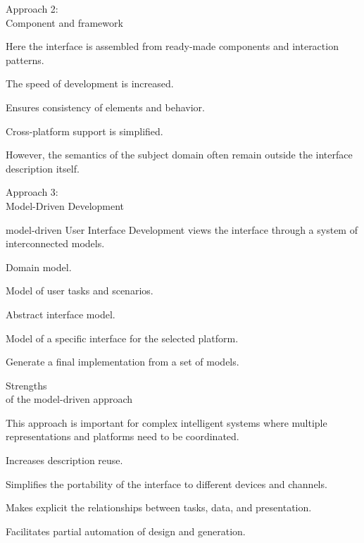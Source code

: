\begin{frame}{Approach 2:\\ Component and framework}
	\topline
	\justifying
	
	Here the interface is assembled from ready-made components and interaction patterns.
	
	\begin{textitemize}
		\item The speed of development is increased.
		\item Ensures consistency of elements and behavior.
		\item Cross-platform support is simplified.
		\item However, the semantics of the subject domain often remain outside the interface description itself.
	\end{textitemize}
\end{frame}

\begin{frame}{Approach 3:\\ Model-Driven Development}
	\topline
	\justifying
	
	model-driven User Interface Development views the interface through a system of interconnected models.
	
	\begin{textitemize}
		\item Domain model.
		\item Model of user tasks and scenarios.
		\item Abstract interface model.
		\item Model of a specific interface for the selected platform.
		\item Generate a final implementation from a set of models.
	\end{textitemize}
\end{frame}

\begin{frame}{Strengths\\ of the model-driven approach}
	\topline
	\justifying
	
	This approach is important for complex intelligent systems where multiple representations and platforms need to be coordinated.
	
	\begin{textitemize}
		\item Increases description reuse.
		\item Simplifies the portability of the interface to different devices and channels.
		\item Makes explicit the relationships between tasks, data, and presentation.
		\item Facilitates partial automation of design and generation.
	\end{textitemize}
\end{frame}


